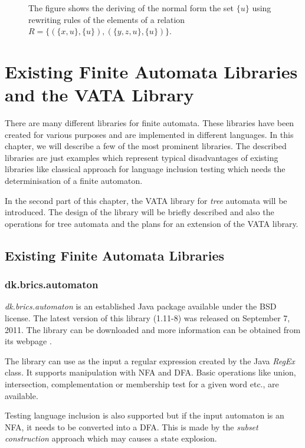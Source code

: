 \begin{figure}[bt]
  \begin{center}
    
    \caption{The figure shows the deriving of the normal form the set $\{u\}$ using rewriting
      rules of the elements of a relation $R=\{(\{x,u\},\{u\}),(\{y,z,u\},\{u\})\}$.}
    \label{figHKCRewO}
  \end{center}
\end{figure}

\chapter{Existing Finite Automata Libraries and the VATA Library} 
\label{libraries}
There are many different libraries for finite automata. These libraries have been created for various purposes and 
are implemented in different languages. 
In this chapter, we will describe a few of the most prominent libraries. 
The described libraries are just examples which represent typical disadvantages of existing libraries like
classical approach for language inclusion testing which needs the determinisation of a finite automaton. 

In the second part of this chapter, the VATA library for \emph{tree} automata will be introduced. 
The design of the library will be briefly described and also the operations for tree
automata and the plans for an extension of the VATA library.

\section{Existing Finite Automata Libraries}
\label{existinglibraries}
\subsection{dk.brics.automaton}
\label{brics}
\emph{dk.brics.automaton} is an established Java package available under the BSD license. The latest version of this library (1.11-8) 
was released on September 7, 2011.
The library can be downloaded and more information can be obtained from its webpage \cite{brics}. 

The library can use as the input a regular expression created by the Java \emph{RegEx} class.
It supports manipulation with NFA and DFA. Basic operations like union,
intersection, complementation or membership test for a given word etc., are available.

Testing language inclusion is also supported but if the input automaton is an NFA, it needs to be converted into a DFA. 
This is made by the \emph{subset construction} approach which may causes a state explosion.

